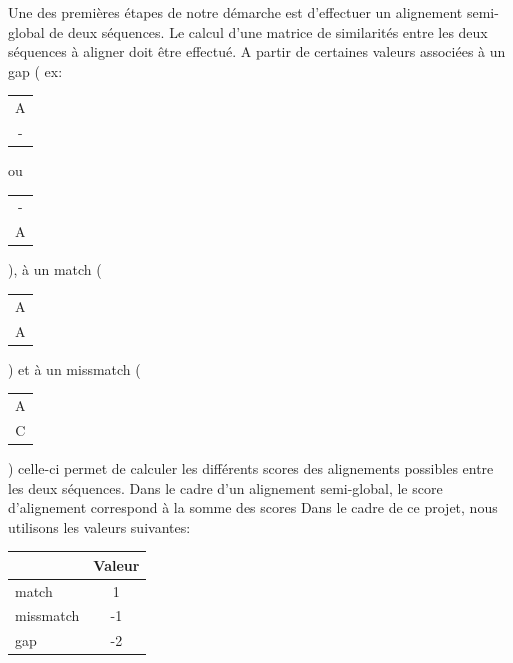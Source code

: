 Une des premières étapes de notre démarche est d'effectuer un alignement semi-global
de deux séquences. Le calcul d'une matrice de similarités entre les deux séquences à aligner doit être effectué. A partir de certaines valeurs associées à un gap ( ex: \begin{tabular}{c} A \\ - \end{tabular} ou \begin{tabular}{c} - \\ A \end{tabular} ), à un match (\begin{tabular}{c} A \\ A \end{tabular}) et à un missmatch (\begin{tabular}{c} A \\ C \end{tabular}) celle-ci permet de calculer les différents scores des alignements possibles entre les deux séquences. Dans le cadre d'un alignement semi-global, le score d'alignement correspond à la somme des scores 
Dans le cadre de ce projet, nous utilisons les valeurs suivantes:

\begin{center}
	\begin{tabular}{|l|c|}
		\hline
		 & Valeur \\
		\hline
		\hline
		match & 1 \\
		\hline
	 	missmatch & -1\\
		\hline
		gap &  -2 \\
		\hline
	\end{tabular}
\end{center}





